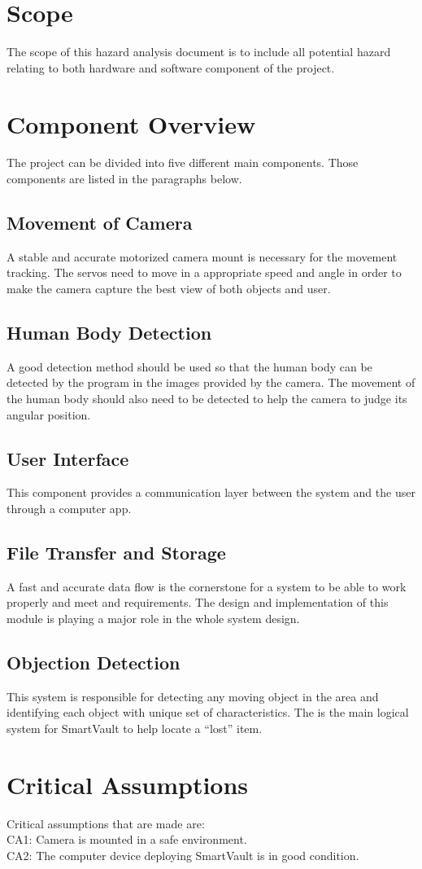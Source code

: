 \documentclass{article}
\begin{document}
\section{Scope}
The scope of this hazard analysis document is to include all potential hazard relating to both hardware and software component of the project. 
\section{Component Overview}
The project can be divided into five different main components. Those components are listed in the paragraphs below.
\subsection{Movement of Camera}
A stable and accurate motorized camera mount is necessary for the movement tracking. The servos need to move in a appropriate speed and angle in order to make the camera capture the best view of both objects and user.
\subsection{Human Body Detection}
A good detection method should be used so that the human body can be detected by the program in the images provided by the camera. The movement of the human body should also need to be detected to help the camera to judge its angular position.
\subsection{User Interface}
This component provides a communication layer between the system and the user through a computer app.
\subsection{File Transfer and Storage}
A fast and accurate data flow is the cornerstone for a system to be able to work properly and meet and requirements. The design and implementation of this module is playing a major role in the whole system design.
\subsection{Objection Detection}
This system is responsible for detecting any moving object in the area and identifying each object with unique set of characteristics. The is the main logical system for SmartVault to help locate a “lost” item.
\section{Critical Assumptions}
Critical assumptions that are made are: \\
CA1: Camera is mounted in a safe environment. \\
CA2: The computer device deploying SmartVault is in good condition.
\end{document}
